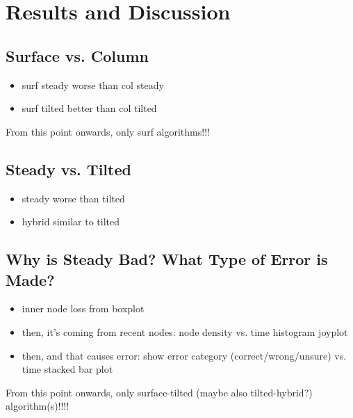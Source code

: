 \section{Results and Discussion} \label{sec:results}







\subsection{Surface vs. Column} \label{sec:surface-vs-column}



\begin{itemize}
    \item surf steady worse than col steady
    \item surf tilted better than col tilted
\end{itemize}

From this point onwards, only surf algorithms!!!

\subsection{Steady vs. Tilted} \label{sec:steady-vs-tilted}
\begin{itemize}
    \item steady worse than tilted
    \item hybrid similar to tilted
\end{itemize}



\subsection{Why is Steady Bad? What Type of Error is Made?} \label{sec:error-analysis}
\begin{itemize}
    \item inner node loss from boxplot
    \item then, it's coming from recent nodes: node density vs. time histogram joyplot
    \item then, and that causes error: show error category (correct/wrong/unsure) vs. time stacked bar plot
\end{itemize}

From this point onwards, only surface-tilted (maybe also tilted-hybrid?) algorithm(s)!!!!

